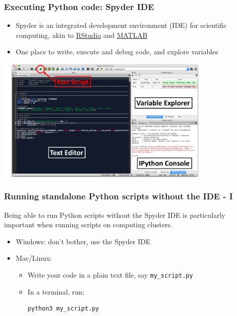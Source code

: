 \documentclass[xcolor=table,aspectratio=169]{beamer}
\begin{document}
\begin{frame}[fragile]
\frametitle{Executing Python code: Spyder IDE}
\begin{itemize}\addtolength{\itemsep}{.7\baselineskip}
	\item Spyder is an integrated development environment (IDE) for scientific computing, akin to \href{https://www.rstudio.com/}{RStudio} and \href{https://uk.mathworks.com/products/matlab.html}{MATLAB} 
        \pause
	\item One place to write, execute and debug code, and explore variables
\end{itemize}

\begin{center}
\includegraphics[width=0.8\textwidth]{spyder_annotated.pdf}
\end{center}
\end{frame}

\begin{frame}[fragile]
\frametitle{Running standalone Python scripts without the IDE - I}
Being able to run Python scripts without the Spyder IDE is particularly important when running scripts on computing clusters. 

    
\begin{itemize}
    \item Windows: don't bother, use the Spyder IDE
        \pause
    \item Mac/Linux: 
        \begin{itemize}
            \item Write your code in a plain text file, say \texttt{my\_script.py}
                \pause
            \item In a terminal, run:
\begin{lstlisting}[style=bash]
python3 my_script.py
\end{lstlisting}
\end{itemize}
\end{itemize}

\end{frame}
\end{document}
